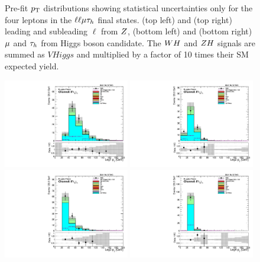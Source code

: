 \begin{figure}[htbp]
     \caption{
Pre-fit $p_\mathrm{T}$ distributions showing statistical uncertainties only for the 
four leptons in the $\ell\ell\mu\tau_{h}$ final states.
(top left) and (top right) leading and subleading $\ell$ from $Z$,
(bottom left) and (bottom right) $\mu$ and $\tau_{h}$ from Higgs boson candidate.
The $WH$ and $ZH$ signals are summed as $VHiggs$ and multiplied by a factor of
10 times their SM expected yield.
     }
     \label{fig:llmt_pts}
\end{figure}

\begin{figure}[htbp]
\centering
     \includegraphics[width=0.49\textwidth]{higgs_to_taus_vh/plots/zh/fr_OS_control/LLTT/pt_1.pdf}
     \includegraphics[width=0.49\textwidth]{higgs_to_taus_vh/plots/zh/fr_OS_control/LLTT/pt_2.pdf}
     \includegraphics[width=0.49\textwidth]{higgs_to_taus_vh/plots/zh/fr_OS_control/LLTT/pt_3.pdf}
     \includegraphics[width=0.49\textwidth]{higgs_to_taus_vh/plots/zh/fr_OS_control/LLTT/pt_4.pdf}

\end{figure}

